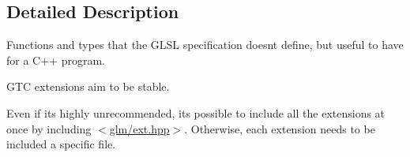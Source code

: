 \subsection{Detailed Description}
Functions and types that the G\+L\+S\+L specification doesn\textquotesingle{}t define, but useful to have for a C++ program. 

G\+T\+C extensions aim to be stable.

Even if it\textquotesingle{}s highly unrecommended, it\textquotesingle{}s possible to include all the extensions at once by including $<$\hyperlink{ext_8hpp_source}{glm/ext.\+hpp}$>$. Otherwise, each extension needs to be included a specific file. 